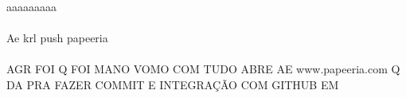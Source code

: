 \documentclass{article}
\begin{document}
\paragraph{}aaaaaaaaa
\paragraph{}Ae krl push papeeria
\paragraph{}AGR FOI Q FOI MANO VOMO COM TUDO ABRE AE www.papeeria.com Q DA PRA FAZER COMMIT E INTEGRAÇÃO COM GITHUB EM
\end{document}
